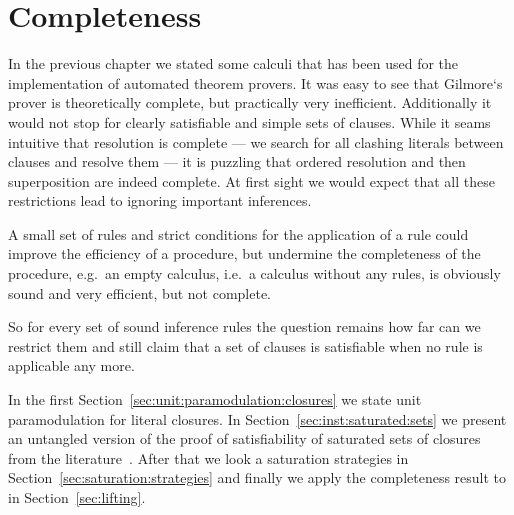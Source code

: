 
\chapter{Completeness}

In the previous chapter we stated some calculi
that has been used for the implementation
of automated theorem provers.
%
It was easy to see that Gilmore`s prover is theoretically complete,
but practically very inefficient.
Additionally it would not stop for clearly satisfiable and simple sets of clauses.
While it seams intuitive that resolution is complete
--- we search for all clashing literals between clauses and resolve them ---
it is puzzling that ordered resolution and then superposition are indeed complete.
At first sight we would expect that all these restrictions
lead to ignoring important inferences.

A small set of rules and strict conditions for the application of a rule
could improve the efficiency of a procedure, but undermine the completeness
of the procedure, e.g.~an empty calculus,
i.e.~a calculus without any rules,
is obviously sound and very efficient, but not complete.

So for every set of sound inference rules the question remains
how far can we restrict them and still claim
that a set of clauses is satisfiable when no rule is applicable any more.







In the first Section~\vref{sec:unit:paramodulation:closures}
we state unit paramodulation for literal closures.
In Section~\vref{sec:inst:saturated:sets} we present
an untangled version of the proof of satisfiability
of saturated sets of closures
from the literature~\cite{GK2004csl}.
After that we look a saturation strategies in
Section~\vref{sec:saturation:strategies}
and finally we apply the completeness result to \InstGenEQ{}
in Section~\vref{sec:lifting}.



